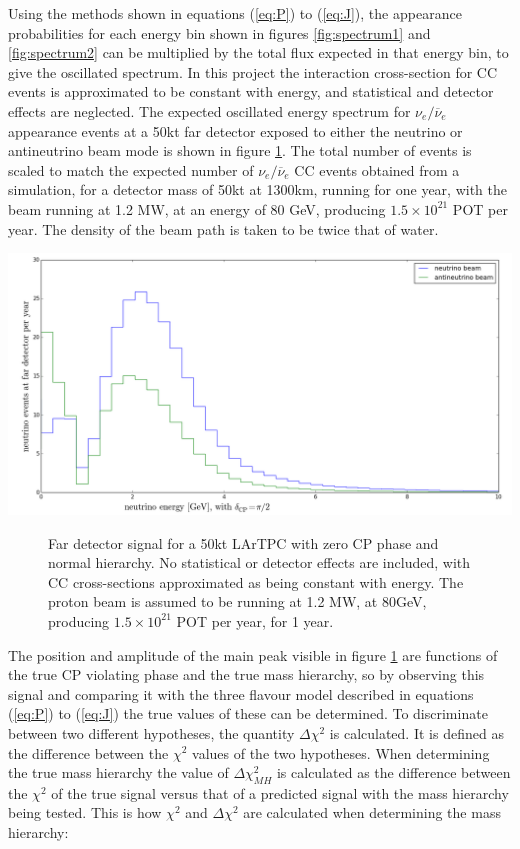 \documentclass[12pt]{article}
\begin{document}
Using the methods shown in equations (\ref{eq:P}) to (\ref{eq:J}), the appearance probabilities for each energy bin shown in figures \ref{fig:spectrum1} and \ref{fig:spectrum2} can be multiplied by the total flux expected in that energy bin, to give the oscillated spectrum\cite{LBNE}. In this project the interaction cross-section for CC events is approximated to be constant with energy, and statistical and detector effects are neglected. The expected oscillated energy spectrum for $\nu_e / \overline{\nu}_e$ appearance events at a 50kt far detector exposed to either the neutrino or antineutrino beam mode is shown in figure \ref{fig:signal}. The total number of events is scaled to match the expected number of $\nu_e / \overline{\nu}_e$ CC events obtained from a simulation\cite{GLOBES}, for a detector mass of 50kt at 1300km, running for one year, with the beam running at 1.2 MW, at an energy of 80 GeV, producing $1.5\times 10^{21}$ POT per year. The density of the beam path is taken to be twice that of water\cite{PREM}.
\begin{center}
\includegraphics[scale=0.4]{Signal.png}
\begin{figure}[h!]
\caption{Far detector signal for a 50kt LArTPC with zero CP phase and normal hierarchy. No statistical or detector effects are included, with CC cross-sections approximated as being constant with energy. The proton beam is assumed to be running at 1.2 MW, at 80GeV, producing $1.5\times 10^{21}$ POT per year, for 1 year.}
\label{fig:signal}
\end{figure}
\end{center}
The position and amplitude of the main peak visible in figure \ref{fig:signal} are functions of the true CP violating phase and the true mass hierarchy, so by observing this signal and comparing it with the three flavour model described in equations (\ref{eq:P}) to (\ref{eq:J}) the true values of these can be determined. To discriminate between two different hypotheses, the quantity $\Delta \chi^2$ is calculated. It is defined as the difference between the $\chi^2$ values of the two hypotheses. When determining the true mass hierarchy the value of $\Delta \chi^2_{MH}$ is calculated as the difference between the $\chi^2$ of the true signal versus that of a predicted signal with the mass hierarchy being tested. This is how $\chi^2$ and $\Delta \chi^2$ are calculated when determining the mass hierarchy\cite{CHI}:
\end{document}
